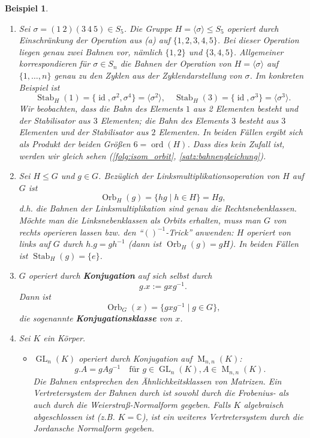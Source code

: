 \documentclass[a4paper, twoside, 11pt, ngerman]{report}
\DeclareMathOperator{\GL}{GL}
\DeclareMathOperator{\ident}{id}
\DeclareMathOperator{\Mat}{M}
\DeclareMathOperator{\Orb}{Orb}
\DeclareMathOperator{\ord}{ord}
\DeclareMathOperator{\Stab}{Stab}
\theoremstyle{definistyle}
\newtheorem{bsp}[satz]{Beispiel}
\theoremstyle{remark}
\newcommand{\defn}[1]{\textit{\bfseries #1}}
\begin{document}
\begin{bsp}
\begin{enumerate}[label=(\alph*)]
    \item Sei $\sigma=(1\  2)(3\  4\  5)\in S_5$. Die Gruppe $H=\langle \sigma\rangle\leq S_5$ operiert durch Einschränkung der Operation aus (a) auf
    $\{1,2,3,4,5\}$. Bei dieser Operation liegen genau zwei Bahnen vor, nämlich $\{1,2\}$
    und $\{3,4,5\}$. Allgemeiner korrespondieren für $\sigma\in S_n$ die Bahnen der Operation von $H=\langle\sigma\rangle$ auf $\{1,\ldots,n\}$ genau zu den Zyklen aus der Zyklendarstellung von $\sigma$. Im konkreten Beispiel ist
    \[
    \Stab_H(1)=\{\ident,\sigma^2,\sigma^4\}=\langle\sigma^2\rangle, \quad
    \Stab_H(3)=\{\ident,\sigma^3\}=\langle\sigma^3\rangle.
    \]
    Wir beobachten, dass die Bahn des Elements $1$ aus 2 Elementen besteht und der Stabilisator
    aus $3$ Elementen; die Bahn des Elements $3$ besteht aus $3$ Elementen und der Stabilisator
    aus $2$ Elementen. In beiden Fällen ergibt sich als Produkt der beiden Größen $6=\ord(H)$.
    Dass dies kein Zufall ist, werden wir gleich sehen (\ref{folg:isom_orbit}, \ref{satz:bahnengleichung}).
    \item Sei $H \leq G$ und $g \in G$. Bezüglich der Linksmultiplikationsoperation von $H$ auf $G$ ist \[\Orb_H(g) = \{h g \mid h \in H\} = H g,\]
    d.h. die Bahnen der Linksmultiplikation sind genau die Rechtsnebenklassen.
    Möchte man die Linksnebenklassen als Orbits erhalten, muss man $G$ von rechts operieren lassen bzw. den "`$()^{-1}$-Trick"' anwenden: $H$ operiert von links auf $G$ durch $h . g = g h^{-1}$ (dann ist $\Orb_H(g) = g H$). In beiden Fällen ist $\Stab_H(g) = \{e\}$.

    \item $G$ operiert durch \defn{Konjugation} auf sich selbst durch \[g . x := g x g^{-1}.\] Dann ist \[\Orb_G(x) = \{g x g^{-1} \mid g \in G\},\] die sogenannte \defn{Konjugationsklasse} von $x$.

    \item Sei $K$ ein Körper.
    \begin{itemize}
    
    \item $\GL_n(K)$ operiert durch Konjugation auf $\Mat_{n,n}(K)$:
    \[
    g.A=gAg^{-1} \quad \text{für } g\in\GL_n(K), A\in\Mat_{n,n}(K). 
    \]
    Die Bahnen entsprechen den Ähnlichkeitsklassen von Matrizen. Ein Vertretersystem der Bahnen durch ist sowohl durch die Frobenius- als auch durch die Weierstraß-Normalform gegeben. Falls $K$ algebraisch abgeschlossen ist (z.B. $K=\mathbb{C}$), ist ein weiteres Vertretersystem durch die Jordansche Normalform gegeben.
    

\end{itemize}
\end{enumerate}
\end{bsp}
\end{document}
